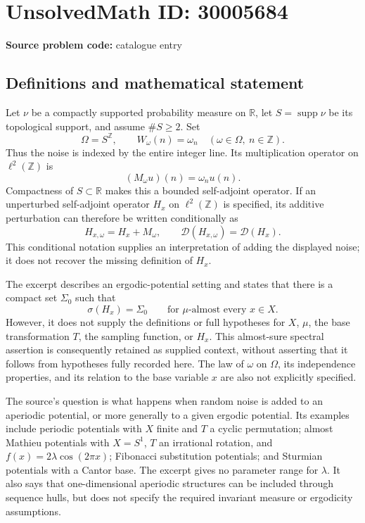 \documentclass[11pt]{article}
\newcommand{\Z}{\mathbb{Z}}
\newcommand{\R}{\mathbb{R}}
\begin{document}
\section*{UnsolvedMath ID: 30005684}
\textbf{Source problem code:} catalogue entry
\subsection{Definitions and mathematical statement}
Let \(\nu\) be a compactly supported probability measure on \(\R\), let \(S=\operatorname{supp}\nu\) be its topological support, and assume \(\#S\geq 2\). Set
\[
\Omega=S^{\Z},\qquad W_\omega(n)=\omega_n\quad(\omega\in\Omega,\ n\in\Z).
\]
Thus the noise is indexed by the entire integer line. Its multiplication operator on \(\ell^2(\Z)\) is
\[
(M_\omega u)(n)=\omega_nu(n).
\]
Compactness of \(S\subset\R\) makes this a bounded self-adjoint operator. If an unperturbed self-adjoint operator \(H_x\) on \(\ell^2(\Z)\) is specified, its additive perturbation can therefore be written conditionally as
\[
H_{x,\omega}=H_x+M_\omega,\qquad
\mathcal D(H_{x,\omega})=\mathcal D(H_x).
\]
This conditional notation supplies an interpretation of adding the displayed noise; it does not recover the missing definition of \(H_x\).

The excerpt describes an ergodic-potential setting and states that there is a compact set \(\Sigma_0\) such that
\[
\sigma(H_x)=\Sigma_0\qquad\text{for }\mu\text{-almost every }x\in X.
\]
However, it does not supply the definitions or full hypotheses for \(X\), \(\mu\), the base transformation \(T\), the sampling function, or \(H_x\). This almost-sure spectral assertion is consequently retained as supplied context, without asserting that it follows from hypotheses fully recorded here. The law of \(\omega\) on \(\Omega\), its independence properties, and its relation to the base variable \(x\) are also not explicitly specified.

The source's question is what happens when random noise is added to an aperiodic potential, or more generally to a given ergodic potential. Its examples include periodic potentials with \(X\) finite and \(T\) a cyclic permutation; almost Mathieu potentials with \(X=S^1\), \(T\) an irrational rotation, and \(f(x)=2\lambda\cos(2\pi x)\); Fibonacci substitution potentials; and Sturmian potentials with a Cantor base. The excerpt gives no parameter range for \(\lambda\). It also says that one-dimensional aperiodic structures can be included through sequence hulls, but does not specify the required invariant measure or ergodicity assumptions.
\end{document}
